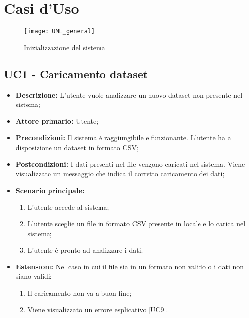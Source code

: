 \chapter{Casi d'Uso}


\begin{figure}[h]
  \centering
  \texttt{[image: UML\_general]}
  \caption{Inizializzazione del sistema}
\end{figure}
\section{UC1 - Caricamento dataset}
\begin{itemize}
  \item \textbf{Descrizione:} L'utente vuole analizzare un nuovo dataset non presente nel sistema;
  \item \textbf{Attore primario:} Utente;
  \item \textbf{Precondizioni:} Il sistema è raggiungibile e funzionante. L’utente ha a disposizione un dataset in formato CSV;
  \item \textbf{Postcondizioni:} I dati presenti nel file vengono caricati nel sistema. Viene visualizzato un messaggio che indica il corretto caricamento dei dati;
  \item \textbf{Scenario principale:}
  \begin{enumerate}
    \item L'utente accede al sistema;
    \item L'utente sceglie un file in formato CSV presente in locale e lo carica nel sistema;
    \item L'utente è pronto ad analizzare i dati.
  \end{enumerate}
  \item \textbf{Estensioni:}
    Nel caso in cui il file sia in un formato non valido o i dati non siano validi:
    \begin{enumerate}
      \item Il caricamento non va a buon fine;
      \item Viene visualizzato un errore esplicativo [UC9].
    \end{enumerate}
\end{itemize}

